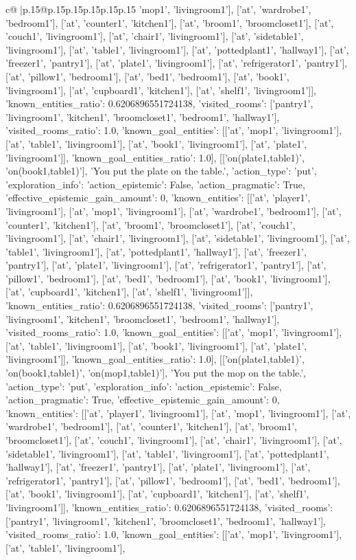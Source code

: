 \documentclass{article}
\begin{document}
{\begin{supertabular}{c@{$\;$}|p{.15\linewidth}@{}p{.15\linewidth}p{.15\linewidth}p{.15\linewidth}p{.15\linewidth}p{.15\linewidth}}
{{{'mop1', 'livingroom1'], ['at', 'wardrobe1', 'bedroom1'], ['at', 'counter1', 'kitchen1'], ['at', 'broom1', 'broomcloset1'], ['at', 'couch1', 'livingroom1'], ['at', 'chair1', 'livingroom1'], ['at', 'sidetable1', 'livingroom1'], ['at', 'table1', 'livingroom1'], ['at', 'pottedplant1', 'hallway1'], ['at', 'freezer1', 'pantry1'], ['at', 'plate1', 'livingroom1'], ['at', 'refrigerator1', 'pantry1'], ['at', 'pillow1', 'bedroom1'], ['at', 'bed1', 'bedroom1'], ['at', 'book1', 'livingroom1'], ['at', 'cupboard1', 'kitchen1'], ['at', 'shelf1', 'livingroom1']], 'known_entities_ratio': 0.6206896551724138, 'visited_rooms': ['pantry1', 'livingroom1', 'kitchen1', 'broomcloset1', 'bedroom1', 'hallway1'], 'visited_rooms_ratio': 1.0, 'known_goal_entities': [['at', 'mop1', 'livingroom1'], ['at', 'table1', 'livingroom1'], ['at', 'book1', 'livingroom1'], ['at', 'plate1', 'livingroom1']], 'known_goal_entities_ratio': 1.0}}], [['on(plate1,table1)', 'on(book1,table1)'], 'You put the plate on the table.', {'action_type': 'put', 'exploration_info': {'action_epistemic': False, 'action_pragmatic': True, 'effective_epistemic_gain_amount': 0, 'known_entities': [['at', 'player1', 'livingroom1'], ['at', 'mop1', 'livingroom1'], ['at', 'wardrobe1', 'bedroom1'], ['at', 'counter1', 'kitchen1'], ['at', 'broom1', 'broomcloset1'], ['at', 'couch1', 'livingroom1'], ['at', 'chair1', 'livingroom1'], ['at', 'sidetable1', 'livingroom1'], ['at', 'table1', 'livingroom1'], ['at', 'pottedplant1', 'hallway1'], ['at', 'freezer1', 'pantry1'], ['at', 'plate1', 'livingroom1'], ['at', 'refrigerator1', 'pantry1'], ['at', 'pillow1', 'bedroom1'], ['at', 'bed1', 'bedroom1'], ['at', 'book1', 'livingroom1'], ['at', 'cupboard1', 'kitchen1'], ['at', 'shelf1', 'livingroom1']], 'known_entities_ratio': 0.6206896551724138, 'visited_rooms': ['pantry1', 'livingroom1', 'kitchen1', 'broomcloset1', 'bedroom1', 'hallway1'], 'visited_rooms_ratio': 1.0, 'known_goal_entities': [['at', 'mop1', 'livingroom1'], ['at', 'table1', 'livingroom1'], ['at', 'book1', 'livingroom1'], ['at', 'plate1', 'livingroom1']], 'known_goal_entities_ratio': 1.0}}], [['on(plate1,table1)', 'on(book1,table1)', 'on(mop1,table1)'], 'You put the mop on the table.', {'action_type': 'put', 'exploration_info': {'action_epistemic': False, 'action_pragmatic': True, 'effective_epistemic_gain_amount': 0, 'known_entities': [['at', 'player1', 'livingroom1'], ['at', 'mop1', 'livingroom1'], ['at', 'wardrobe1', 'bedroom1'], ['at', 'counter1', 'kitchen1'], ['at', 'broom1', 'broomcloset1'], ['at', 'couch1', 'livingroom1'], ['at', 'chair1', 'livingroom1'], ['at', 'sidetable1', 'livingroom1'], ['at', 'table1', 'livingroom1'], ['at', 'pottedplant1', 'hallway1'], ['at', 'freezer1', 'pantry1'], ['at', 'plate1', 'livingroom1'], ['at', 'refrigerator1', 'pantry1'], ['at', 'pillow1', 'bedroom1'], ['at', 'bed1', 'bedroom1'], ['at', 'book1', 'livingroom1'], ['at', 'cupboard1', 'kitchen1'], ['at', 'shelf1', 'livingroom1']], 'known_entities_ratio': 0.6206896551724138, 'visited_rooms': ['pantry1', 'livingroom1', 'kitchen1', 'broomcloset1', 'bedroom1', 'hallway1'], 'visited_rooms_ratio': 1.0, 'known_goal_entities': [['at', 'mop1', 'livingroom1'], ['at', 'table1', 'livingroom1'], }}}
\end{supertabular}}
\end{document}
